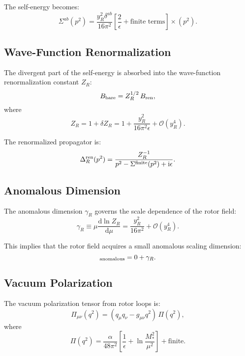 \documentclass[11pt,a4paper]{article}
\numberwithin{equation}{section}
\theoremstyle{plain}
\theoremstyle{definition}
\theoremstyle{remark}
\newcommand{\dd}{\mathrm{d}}
\newcommand{\ii}{\mathrm{i}}
\newcommand{\Rfield}{R(x)}                  %
\begin{document}
The self-energy becomes:
\begin{equation}
\Sigma^{ab}(p^2) = \frac{y_R^2\delta^{ab}}{16\pi^2}\left[\frac{2}{\epsilon} + \text{finite terms}\right]\times (p^2).
\label{eq:Sigma-div}
\end{equation}

\subsection{Wave-Function Renormalization}

The divergent part of the self-energy is absorbed into the wave-function renormalization constant $Z_R$:
\begin{equation}
B_{\rm bare} = Z_R^{1/2}\,B_{\rm ren},
\label{eq:Z-R}
\end{equation}
where
\begin{equation}
Z_R = 1 + \delta Z_R = 1 + \frac{y_R^2}{16\pi^2\epsilon} + \mathcal{O}(y_R^4).
\label{eq:delta-Z-R}
\end{equation}

The renormalized propagator is:
\begin{equation}
\Delta_R^{\rm ren}(p^2) = \frac{Z_R^{-1}}{p^2 - \Sigma^{\rm finite}(p^2) + \ii\epsilon}.
\label{eq:prop-ren}
\end{equation}

\subsection{Anomalous Dimension}

The anomalous dimension $\gamma_R$ governs the scale dependence of the rotor field:
\begin{equation}
\gamma_R \equiv \mu\frac{\dd\ln Z_R}{\dd\mu} = \frac{y_R^2}{16\pi^2} + \mathcal{O}(y_R^4).
\label{eq:gamma-R}
\end{equation}

This implies that the rotor field acquires a small anomalous scaling dimension:
\begin{equation}
[\Rfield]_{\rm anomalous} = 0 + \gamma_R.
\label{eq:dim-anomalous}
\end{equation}

\subsection{Vacuum Polarization}

The vacuum polarization tensor from rotor loops is:
\begin{equation}
\Pi_{\mu\nu}(q^2) = (q_\mu q_\nu - g_{\mu\nu}q^2)\,\Pi(q^2),
\label{eq:vacuum-pol}
\end{equation}
where
\begin{equation}
\Pi(q^2) = \frac{\alpha}{48\pi^2}\left[\frac{1}{\epsilon} + \ln\frac{M_*^2}{\mu^2}\right] + \text{finite}.
\label{eq:Pi}
\end{equation}
\end{document}
